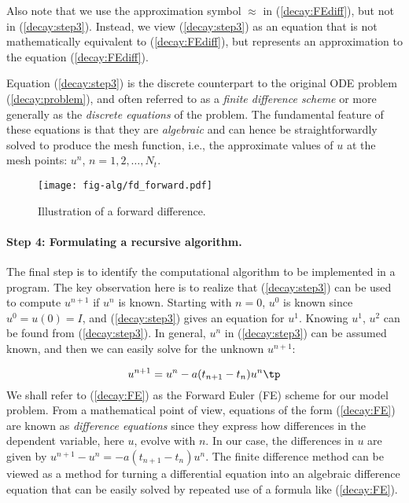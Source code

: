 \documentclass[graybox,sectrefs,envcountresetchap,open=right,final]{svmonodo}
\begin{document}
Also note that we use the approximation symbol $\approx$ in (\ref{decay:FEdiff}),
but not in (\ref{decay:step3}). Instead, we view (\ref{decay:step3}) as
an equation that is not mathematically equivalent to (\ref{decay:FEdiff}),
but represents an approximation to the equation (\ref{decay:FEdiff}).

Equation (\ref{decay:step3})
is the discrete counterpart to the original ODE problem
(\ref{decay:problem}), and often referred to as a \emph{finite difference scheme}
or more generally as the \emph{discrete equations} of the problem.
The fundamental feature of these equations is that they are \emph{algebraic}
and can hence be straightforwardly solved to produce the mesh function, i.e.,
the approximate values of $u$ at
the mesh points: $u^n$, $n=1,2,\ldots,N_t$.

\begin{figure}[!ht]  %
  \centerline{\texttt{[image: fig-alg/fd\_forward.pdf]}}
  \caption{
  Illustration of a forward difference. \label{decay:sketch:FE}
  }
\end{figure}


\paragraph{Step 4: Formulating a recursive algorithm.}
The final step is to identify the computational algorithm to be implemented
in a program. The key observation here is to realize that
(\ref{decay:step3}) can be used to compute $u^{n+1}$ if $u^n$ is known.
Starting with $n=0$, $u^0$ is known since $u^0=u(0)=I$, and
(\ref{decay:step3}) gives an equation for $u^1$. Knowing $u^1$,
$u^2$ can be found from (\ref{decay:step3}). In general, $u^n$
in (\ref{decay:step3}) can be assumed known, and then we can easily solve for
the unknown $u^{n+1}$:

\begin{equation}
u^{n+1} = u^n - a(t_{n+1} -t_n)u^n\tp
\label{decay:FE}
\end{equation}
We shall refer to (\ref{decay:FE}) as the Forward Euler (FE) scheme
for our model problem. From a mathematical point of view,
equations of the form (\ref{decay:FE}) are known as
\emph{difference equations} since they express how differences in
the dependent variable, here $u$, evolve with $n$. In our case,
the differences in $u$ are given by $u^{n+1}-u^n = -a(t_{n+1}-t_n)u^n$.
The finite difference method can be viewed as a method for turning
a differential equation into an algebraic difference equation that
can be easily solved by repeated use of a formula like (\ref{decay:FE}).
\end{document}
